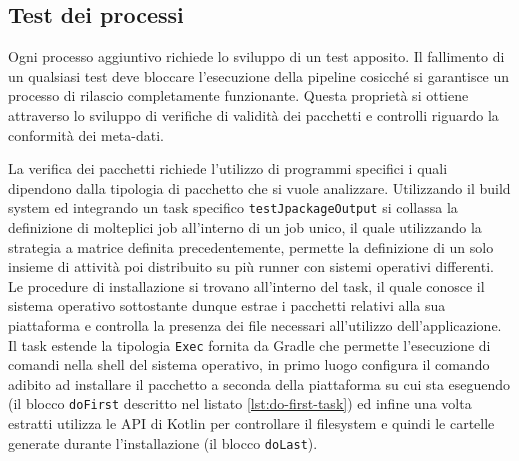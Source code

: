 \subsection{Test dei processi}

Ogni processo aggiuntivo richiede lo sviluppo di un test apposito. Il fallimento di un qualsiasi test deve bloccare l'esecuzione della pipeline cosicché si garantisce un processo di rilascio completamente funzionante. Questa proprietà si ottiene attraverso lo sviluppo di verifiche di validità dei pacchetti e controlli riguardo la conformità dei meta-dati.

La verifica dei pacchetti richiede l'utilizzo di programmi specifici i quali dipendono dalla tipologia di pacchetto che si vuole analizzare. Utilizzando il build system ed integrando un task specifico \texttt{testJpackageOutput} si collassa la definizione di molteplici job all'interno di un job unico, il quale utilizzando la strategia a matrice definita precedentemente, permette la definizione di un solo insieme di attività poi distribuito su più runner con sistemi operativi differenti. Le procedure di installazione si trovano all'interno del task, il quale conosce il sistema operativo sottostante dunque estrae i pacchetti relativi alla sua piattaforma e controlla la presenza dei file necessari all'utilizzo dell'applicazione. Il task estende la tipologia \texttt{Exec} fornita da Gradle che permette l'esecuzione di comandi nella shell del sistema operativo, in primo luogo configura il comando adibito ad installare il pacchetto a seconda della piattaforma su cui sta eseguendo (il blocco \texttt{doFirst} descritto nel listato \ref{lst:do-first-task}) ed infine una volta estratti utilizza le API di Kotlin per controllare il filesystem e quindi le cartelle generate durante l'installazione (il blocco \texttt{doLast}).



